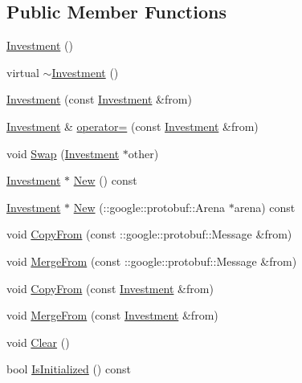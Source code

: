 \subsection*{Public Member Functions}
\begin{DoxyCompactItemize}
\item 
\hyperlink{classinvest_1_1_investment_a4a49eb1f98a034ebd02c7f4fb87b6f15}{Investment} ()
\item 
virtual \hyperlink{classinvest_1_1_investment_aa8316646eb9c87ec50cc6b055d2664f1}{$\sim$\+Investment} ()
\item 
\hyperlink{classinvest_1_1_investment_ac13133e0b8e825f89cf8a34d170a13cd}{Investment} (const \hyperlink{classinvest_1_1_investment}{Investment} \&from)
\item 
\hyperlink{classinvest_1_1_investment}{Investment} \& \hyperlink{classinvest_1_1_investment_a1a0eaac5e30dcb2fd61ec968410b49a3}{operator=} (const \hyperlink{classinvest_1_1_investment}{Investment} \&from)
\item 
void \hyperlink{classinvest_1_1_investment_adb31a280e15604167be59db8c5c545a3}{Swap} (\hyperlink{classinvest_1_1_investment}{Investment} $\ast$other)
\item 
\hyperlink{classinvest_1_1_investment}{Investment} $\ast$ \hyperlink{classinvest_1_1_investment_aff2b064b6d6fa8009a1c6e4b3e5c901f}{New} () const 
\item 
\hyperlink{classinvest_1_1_investment}{Investment} $\ast$ \hyperlink{classinvest_1_1_investment_a1586c409a48522ca6147ff83af4e3cbb}{New} (\+::google\+::protobuf\+::\+Arena $\ast$arena) const 
\item 
void \hyperlink{classinvest_1_1_investment_ac82ae589b7f7e92c7ad998ac53cdbe9f}{Copy\+From} (const \+::google\+::protobuf\+::\+Message \&from)
\item 
void \hyperlink{classinvest_1_1_investment_ae40a7ce3c8bd85ee8cf5fc354f293956}{Merge\+From} (const \+::google\+::protobuf\+::\+Message \&from)
\item 
void \hyperlink{classinvest_1_1_investment_a571c446d5aba6e40978af00c57ec10cb}{Copy\+From} (const \hyperlink{classinvest_1_1_investment}{Investment} \&from)
\item 
void \hyperlink{classinvest_1_1_investment_a03b91dd09ab53d1989cc0b0c75417c1e}{Merge\+From} (const \hyperlink{classinvest_1_1_investment}{Investment} \&from)
\item 
void \hyperlink{classinvest_1_1_investment_a746ae31a98a9161ffa905e9b98342f7f}{Clear} ()
\item 
bool \hyperlink{classinvest_1_1_investment_ae2d36ba530566b601b63abf59eb637a6}{Is\+Initialized} () const 

\end{DoxyCompactItemize}
